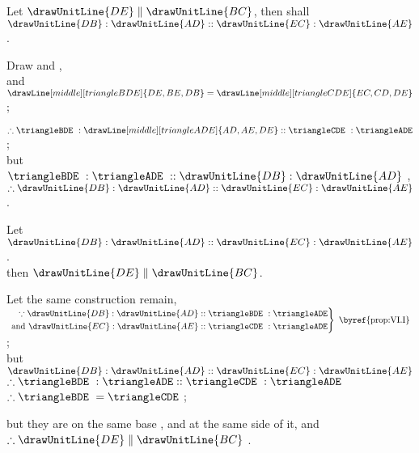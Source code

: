 \documentclass[booklanguage=english]{byrnebook}
\begin{document}
\drawCurrentPictureInMargin
{}

\begin{center}
Let $\drawUnitLine{DE} \parallel \drawUnitLine{BC}$, then shall\\
$\drawUnitLine{DB} : \drawUnitLine{AD} :: \drawUnitLine{EC} : \drawUnitLine{AE}$.

Draw  and ,\\
and
$\drawLine[middle][triangleBDE]{DE,BE,DB}
=
\drawLine[middle][triangleCDE]{EC,CD,DE}$ ;

$\therefore \triangleBDE\ :
\drawLine[middle][triangleADE]{AD,AE,DE} :: \triangleCDE\ : \triangleADE$ ;\\
but $\triangleBDE\ : \triangleADE\ :: \drawUnitLine{DB} : \drawUnitLine{AD}$ ,\\
$\therefore \drawUnitLine{DB} : \drawUnitLine{AD} :: \drawUnitLine{EC} : \drawUnitLine{AE}$ .
\end{center}

\vfill\pagebreak

\begin{center}
Let $\drawUnitLine{DB} : \drawUnitLine{AD} :: \drawUnitLine{EC} : \drawUnitLine{AE}$.\\
then $\drawUnitLine{DE} \parallel \drawUnitLine{BC}$.

Let the same construction remain,\\
$\left.
\begin{aligned}
\because \drawUnitLine{DB} : \drawUnitLine{AD} &:: \triangleBDE\ : \triangleADE \\ %
\mbox{ and } \drawUnitLine{EC} : \drawUnitLine{AE} &:: \triangleCDE\ : \triangleADE \\
\end{aligned}
\right\}\mbox{ \byref{prop:VI.I} }$;\\
but $\drawUnitLine{DB} : \drawUnitLine{AD} :: \drawUnitLine{EC} : \drawUnitLine{AE}$ \byref{\hypref}\\
$\therefore \triangleBDE\ : \triangleADE :: \triangleCDE\ : \triangleADE$ \\
$\therefore \triangleBDE\ = \triangleCDE$ ;

but they are on the same base , and at the same side of it, and\\
$\therefore \drawUnitLine{DE} \parallel \drawUnitLine{BC}$ .
\end{center}
\end{document}
